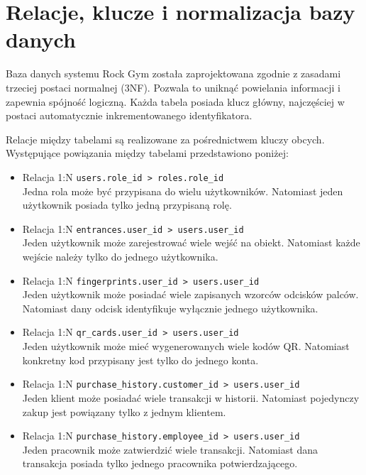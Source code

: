\section{Relacje, klucze i normalizacja bazy danych}

Baza danych systemu Rock Gym została zaprojektowana zgodnie z zasadami trzeciej postaci normalnej (3NF). Pozwala to uniknąć powielania informacji i zapewnia spójność logiczną. Każda tabela posiada klucz główny, najczęściej w postaci automatycznie inkrementowanego identyfikatora.

Relacje między tabelami są realizowane za pośrednictwem kluczy obcych. Występujące powiązania między tabelami przedstawiono poniżej:

\begin{itemize}
    \item Relacja 1:N \texttt{users.role\_id > roles.role\_id} \\
          Jedna rola może być przypisana do wielu użytkowników. Natomiast jeden użytkownik posiada tylko jedną przypisaną rolę.

    \item Relacja 1:N \texttt{entrances.user\_id > users.user\_id} \\
          Jeden użytkownik może zarejestrować wiele wejść na obiekt. Natomiast każde wejście należy tylko do jednego użytkownika.

    \item Relacja 1:N \texttt{fingerprints.user\_id > users.user\_id} \\
          Jeden użytkownik może posiadać wiele zapisanych wzorców odcisków palców. Natomiast dany odcisk identyfikuje wyłącznie jednego użytkownika.

    \item Relacja 1:N \texttt{qr\_cards.user\_id > users.user\_id} \\
          Jeden użytkownik może mieć wygenerowanych wiele kodów QR. Natomiast konkretny kod przypisany jest tylko do jednego konta.

    \item Relacja 1:N \texttt{purchase\_history.customer\_id > users.user\_id} \\
          Jeden klient może posiadać wiele transakcji w historii. Natomiast pojedynczy zakup jest powiązany tylko z jednym klientem.

    \item Relacja 1:N \texttt{purchase\_history.employee\_id > users.user\_id} \\
          Jeden pracownik może zatwierdzić wiele transakcji. Natomiast dana transakcja posiada tylko jednego pracownika potwierdzającego.


\end{itemize}
